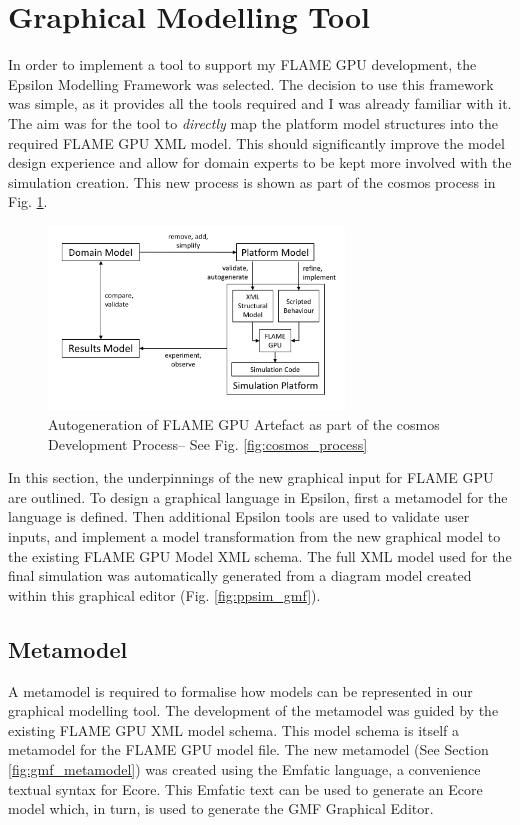 \documentclass{UoYCSproject}
\begin{document}
\section{Graphical Modelling Tool}
In order to implement a tool to support my \gls{FLAME GPU} development, the Epsilon Modelling Framework was selected.
The decision to use this framework was simple, as it provides all the tools required and I was already familiar with it.
The aim was for the tool to \textit{directly} map the platform model structures into the required \gls{FLAME GPU} XML model.
This should significantly improve the model design experience and allow for domain experts to be kept more involved with the simulation creation.
This new process is shown as part of the \gls{cosmos} process in Fig. \ref{fig:flame_improved}.

\begin{figure}[htp]
\centering
\includegraphics[width=0.7\textwidth]{Appendix/CoSMoS_FLAME}
\caption{Autogeneration of \gls{FLAME GPU} Artefact as part of the \gls{cosmos} Development Process-- See Fig. \ref{fig:cosmos_process}}
\label{fig:flame_improved}
\end{figure}

In this section, the underpinnings of the new graphical input for \gls{FLAME GPU} are outlined.
To design a graphical language in Epsilon, first a metamodel for the language is defined.
Then additional Epsilon tools are used to validate user inputs, and implement a model transformation from the new graphical model to the existing \gls{FLAME GPU} Model XML schema.
The full XML model used for the final simulation was automatically generated from a diagram model created within this graphical editor (Fig. \ref{fig:ppsim_gmf}).

\subsection{Metamodel}
A metamodel is required to formalise how models can be represented in our graphical modelling tool.
The development of the metamodel was guided by the existing \gls{FLAME GPU} XML model schema.
This model schema is itself a metamodel for the \gls{FLAME GPU} model file.
The new metamodel (See Section \ref{fig:gmf_metamodel}) was created using the Emfatic language, a convenience textual syntax for Ecore.
This Emfatic text can be used to generate an Ecore model which, in turn, is used to generate the GMF Graphical Editor.
\end{document}
